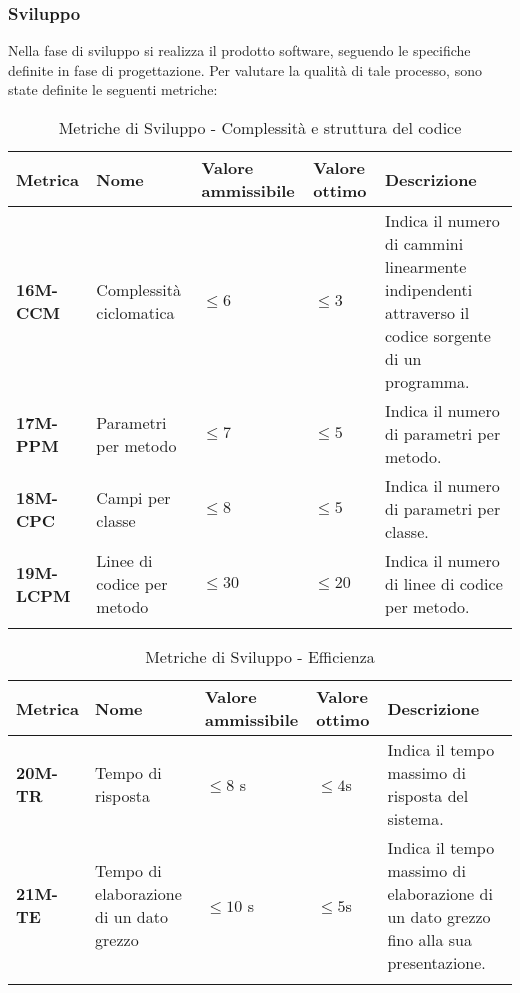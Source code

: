 \subsubsection{Sviluppo}
Nella fase di sviluppo si realizza il prodotto software, seguendo le specifiche definite in fase di progettazione.
Per valutare la qualità di tale processo, sono state definite le seguenti metriche:
\begin{longtable}{|>{\raggedright\arraybackslash}m{}|>{\raggedright\arraybackslash}m{}|>{\raggedright\arraybackslash}m{}|>{\raggedright\arraybackslash}m{}|>{\raggedright\arraybackslash}m{}|}
	\hline
	\textbf{Metrica} & \textbf{Nome} & \textbf{Valore ammissibile} & \textbf{Valore ottimo} & \textbf{Descrizione}\\
	\hline
	\endhead
	\textbf{16M-CCM} & Complessità ciclomatica & $\leq 6$ & $\leq 3$ & Indica il numero di cammini linearmente indipendenti attraverso il codice sorgente di un programma. \\
	\hline
	\textbf{17M-PPM} & Parametri per metodo & $\leq 7$ & $\leq 5$ & Indica il numero di parametri per metodo.\\
	\hline
	\textbf{18M-CPC} & Campi per classe & $\leq 8$ & $\leq 5$ & Indica il numero di parametri per classe.\\
	\hline
	\textbf{19M-LCPM} & Linee di codice per metodo & $\leq 30$ & $\leq 20$ & Indica il numero di linee di codice per metodo.\\
	\hline
	\caption{Metriche di Sviluppo - Complessità e struttura del codice}
	\label{table:5}
\end{longtable}

\newpage
{}
\begin{longtable}{|>{\raggedright\arraybackslash}m{}|>{\raggedright\arraybackslash}m{}|>{\raggedright\arraybackslash}m{}|>{\raggedright\arraybackslash}m{}|>{\raggedright\arraybackslash}m{}|}
	\hline
	\textbf{Metrica} & \textbf{Nome} & \textbf{Valore ammissibile} & \textbf{Valore ottimo} & \textbf{Descrizione}\\
	\hline
	\endhead
	\textbf{20M-TR} & Tempo di risposta & $\leq 8$ s & $\leq 4$s & Indica il tempo massimo di risposta del sistema.\\
	\hline
	\textbf{21M-TE} & Tempo di elaborazione di un dato grezzo & $\leq 10$ s & $\leq 5$s & Indica il tempo massimo di elaborazione di un dato grezzo fino alla sua presentazione. \\
	\hline
	\caption{Metriche di Sviluppo - Efficienza}
	\label{table:6}
\end{longtable}



